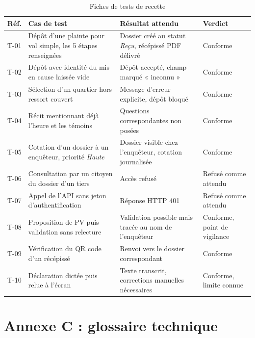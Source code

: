 \begin{table}[H]
    \centering
    \begin{tabularx}{\textwidth}{|l|>{\raggedright\arraybackslash}X|>{\raggedright\arraybackslash}X|l|}
        \hline
        \textbf{Réf.} & \textbf{Cas de test} & \textbf{Résultat attendu} & \textbf{Verdict} \\
        \hline
        T-01 & Dépôt d'une plainte pour vol simple, les 5 étapes renseignées & Dossier créé au statut \textit{Reçu}, récépissé PDF délivré & Conforme \\
        \hline
        T-02 & Dépôt avec identité du mis en cause laissée vide & Dépôt accepté, champ marqué « inconnu » & Conforme \\
        \hline
        T-03 & Sélection d'un quartier hors ressort couvert & Message d'erreur explicite, dépôt bloqué & Conforme \\
        \hline
        T-04 & Récit mentionnant déjà l'heure et les témoins & Questions correspondantes non posées & Conforme \\
        \hline
        T-05 & Cotation d'un dossier à un enquêteur, priorité \textit{Haute} & Dossier visible chez l'enquêteur, cotation journalisée & Conforme \\
        \hline
        T-06 & Consultation par un citoyen du dossier d'un tiers & Accès refusé & Refusé comme attendu \\
        \hline
        T-07 & Appel de l'API sans jeton d'authentification & Réponse HTTP 401 & Refusé comme attendu \\
        \hline
        T-08 & Proposition de PV puis validation sans relecture & Validation possible mais tracée au nom de l'enquêteur & Conforme, point de vigilance \\
        \hline
        T-09 & Vérification du QR code d'un récépissé & Renvoi vers le dossier correspondant & Conforme \\
        \hline
        T-10 & Déclaration dictée puis relue à l'écran & Texte transcrit, corrections manuelles nécessaires & Conforme, limite connue \\
        \hline
    \end{tabularx}
    \caption{Fiches de tests de recette}
    \label{tab:fiches_tests}
\end{table}

\section*{Annexe C : glossaire technique}


